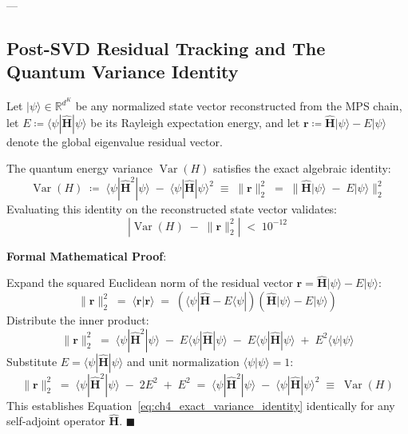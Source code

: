 \documentclass[
    12pt,
    a4paper,
    headings=normal,
    twoside=false,
    open=any,
    parskip=half
]{scrbook}
\newenvironment{myproof}[1][]{%
  \par\vspace{6pt}\noindent\textbf{\sffamily\color{maincolor}Formal Mathematical Proof\ifstrempty{#1}{}{ (#1)}}:\par\nopagebreak
}{%
  \penalty50\hfill\ensuremath{\blacksquare}\par\vspace{6pt}
}
\begin{document}
---

\subsection{Post-SVD Residual Tracking and The Quantum Variance Identity}

\begin{phystheorem}\label{thm:ch4_energy_variance_identity}
Let $|\psi\rangle \in \mathbb{R}^{d^K}$ be any normalized state vector reconstructed from the MPS chain, let $E \coloneqq \langle \psi | \hat{\mathbf{H}} | \psi \rangle$ be its Rayleigh expectation energy, and let $\mathbf{r} \coloneqq \hat{\mathbf{H}}|\psi\rangle - E|\psi\rangle$ denote the global eigenvalue residual vector. 

The quantum energy variance $\operatorname{Var}(H)$ satisfies the exact algebraic identity:
\begin{equation}
\boxed{\operatorname{Var}(H) \;\coloneqq\; \langle \psi | \hat{\mathbf{H}}^2 | \psi \rangle \;-\; \langle \psi | \hat{\mathbf{H}} | \psi \rangle^2 \;\equiv\; \| \mathbf{r} \|_2^2 \;=\; \| \hat{\mathbf{H}}|\psi\rangle \;-\; E|\psi\rangle \|_2^2}
\label{eq:ch4_exact_variance_identity}
\end{equation}
Evaluating this identity on the reconstructed state vector validates:
\begin{equation}
\left| \operatorname{Var}(H) \;-\; \| \mathbf{r} \|_2^2 \right| \;<\; 10^{-12}
\label{eq:ch4_variance_numerical_gap}
\end{equation}
\end{phystheorem}

\begin{myproof}
Expand the squared Euclidean norm of the residual vector $\mathbf{r} = \hat{\mathbf{H}}|\psi\rangle - E|\psi\rangle$:
$$\|\mathbf{r}\|_2^2 \;=\; \langle \mathbf{r} | \mathbf{r} \rangle \;=\; \left( \langle \psi | \hat{\mathbf{H}} - E \langle \psi | \right) \left( \hat{\mathbf{H}}|\psi\rangle - E|\psi\rangle \right)$$
Distribute the inner product:
$$\|\mathbf{r}\|_2^2 \;=\; \langle \psi | \hat{\mathbf{H}}^2 | \psi \rangle \;-\; E \langle \psi | \hat{\mathbf{H}} | \psi \rangle \;-\; E \langle \psi | \hat{\mathbf{H}} | \psi \rangle \;+\; E^2 \langle \psi | \psi \rangle$$
Substitute $E = \langle \psi | \hat{\mathbf{H}} | \psi \rangle$ and unit normalization $\langle \psi | \psi \rangle = 1$:
$$\|\mathbf{r}\|_2^2 \;=\; \langle \psi | \hat{\mathbf{H}}^2 | \psi \rangle \;-\; 2 E^2 \;+\; E^2 \;=\; \langle \psi | \hat{\mathbf{H}}^2 | \psi \rangle \;-\; \langle \psi | \hat{\mathbf{H}} | \psi \rangle^2 \;\equiv\; \operatorname{Var}(H)$$
This establishes Equation~\eqref{eq:ch4_exact_variance_identity} identically for any self-adjoint operator $\hat{\mathbf{H}}$.
\end{myproof}
\end{document}
